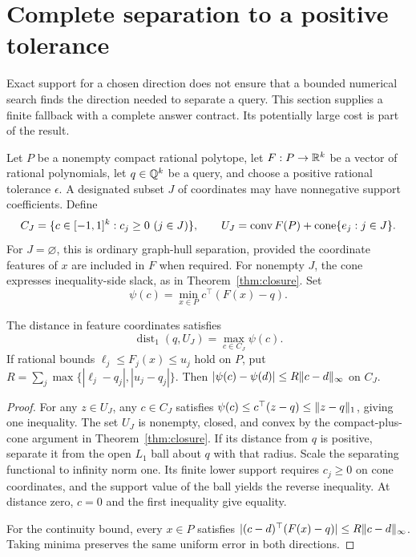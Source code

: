 \section{Complete separation to a positive tolerance}\label{sec:separation}

Exact support for a chosen direction does not ensure that a bounded
numerical search finds the direction needed to separate a query. This
section supplies a finite fallback with a complete answer contract. Its
potentially large cost is part of the result.

Let $P$ be a nonempty compact rational polytope, let
$F:P\to\mathbb R^k$ be a vector of rational polynomials, let
$q\in\mathbb Q^k$ be a query, and choose a positive rational tolerance
$\epsilon$. A designated subset $J$ of coordinates may have nonnegative
support coefficients. Define
\[
C_J=\{c\in[-1,1]^k:c_j\ge0\ (j\in J)\},\qquad
U_J=\operatorname{conv} F(P)+\operatorname{cone}\{e_j:j\in J\}.
\]
For $J=\varnothing$, this is ordinary graph-hull separation, provided
the coordinate features of $x$ are included in $F$ when required.
For nonempty $J$, the cone expresses inequality-side slack, as in
Theorem~\ref{thm:closure}. Set
\[
\psi(c)=\min_{x\in P}c^\top(F(x)-q).
\]

\begin{lemma}\label{lem:distance}
The distance in feature coordinates satisfies
\[
\operatorname{dist}_1(q,U_J)=\max_{c\in C_J}\psi(c).
\]
If rational bounds $\ell_j\le F_j(x)\le u_j$ hold on $P$, put
$R=\sum_j\max\{|\ell_j-q_j|,|u_j-q_j|\}$. Then
$|\psi(c)-\psi(d)|\le R\lVert c-d\rVert_\infty$ on $C_J$.
\end{lemma}
\begin{proof}
For any $z\in U_J$, any $c\in C_J$ satisfies
$\psi(c)\le c^\top(z-q)\le\lVert z-q\rVert_1$, giving one inequality.
The set $U_J$ is nonempty, closed, and convex by the compact-plus-cone
argument in Theorem~\ref{thm:closure}. If its distance from $q$ is
positive, separate it from the open $L_1$ ball about $q$ with that
radius. Scale the separating functional to infinity norm one. Its
finite lower support requires $c_j\ge0$ on cone coordinates, and
the support value of the ball yields the reverse inequality. At distance
zero, $c=0$ and the first inequality give equality.

For the continuity bound, every $x\in P$ satisfies
$|(c-d)^\top(F(x)-q)|\le R\lVert c-d\rVert_\infty$.
Taking minima preserves the same uniform error in both directions.
\end{proof}

